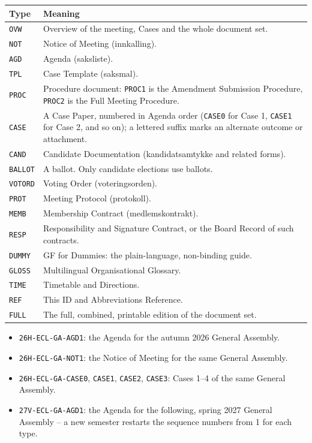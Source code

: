 \documentclass{../../../Common/Latex/Templates/rapport}
\begin{document}
\begin{longtable}{|L{2cm}|L{11.5cm}|}
  \hline
  \textbf{Type} & \textbf{Meaning} \\
  \hline
  \endhead
  \texttt{OVW}    & Overview of the meeting, Cases and the whole document set. \\
  \hline
  \texttt{NOT}    & Notice of Meeting (innkalling). \\
  \hline
  \texttt{AGD}    & Agenda (saksliste). \\
  \hline
  \texttt{TPL}    & Case Template (saksmal). \\
  \hline
  \texttt{PROC}   & Procedure document: \texttt{PROC1} is the Amendment Submission Procedure, \texttt{PROC2} is the Full Meeting Procedure. \\
  \hline
  \texttt{CASE}   & A Case Paper, numbered in Agenda order (\texttt{CASE0} for Case 1, \texttt{CASE1} for Case 2, and so on); a lettered suffix marks an alternate outcome or attachment. \\
  \hline
  \texttt{CAND}   & Candidate Documentation (kandidatsamtykke and related forms). \\
  \hline
  \texttt{BALLOT} & A ballot. Only candidate elections use ballots. \\
  \hline
  \texttt{VOTORD} & Voting Order (voteringsorden). \\
  \hline
  \texttt{PROT}   & Meeting Protocol (protokoll). \\
  \hline
  \texttt{MEMB}   & Membership Contract (medlemskontrakt). \\
  \hline
  \texttt{RESP}   & Responsibility and Signature Contract, or the Board Record of such contracts. \\
  \hline
  \texttt{DUMMY}  & GF for Dummies: the plain-language, non-binding guide. \\
  \hline
  \texttt{GLOSS}  & Multilingual Organisational Glossary. \\
  \hline
  \texttt{TIME}   & Timetable and Directions. \\
  \hline
  \texttt{REF}    & This ID and Abbreviations Reference. \\
  \hline
  \texttt{FULL}   & The full, combined, printable edition of the document set. \\
  \hline
\end{longtable}

\begin{itemize}
  \item \texttt{26H-ECL-GA-AGD1}: the Agenda for the autumn 2026 General Assembly.
  \item \texttt{26H-ECL-GA-NOT1}: the Notice of Meeting for the same General Assembly.
  \item \texttt{26H-ECL-GA-CASE0}, \texttt{CASE1}, \texttt{CASE2}, \texttt{CASE3}: Cases 1--4 of the same General Assembly.
  \item \texttt{27V-ECL-GA-AGD1}: the Agenda for the following, spring 2027 General Assembly -- a new semester restarts the sequence numbers from 1 for each type.
\end{itemize}
\end{document}
